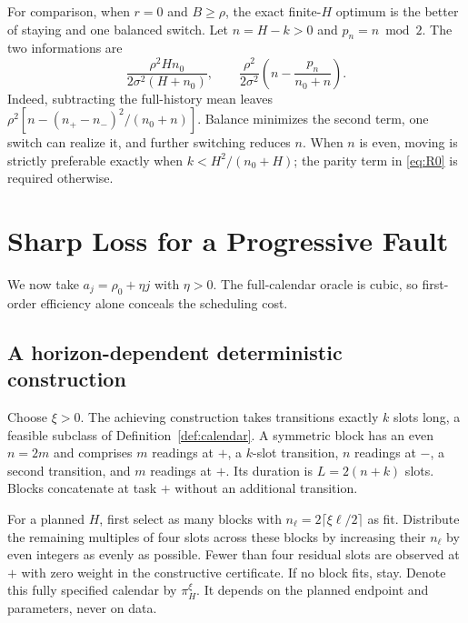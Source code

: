 For comparison, when $r=0$ and $B\ge\rho$, the exact finite-$H$ optimum is the better of staying and one balanced switch. Let $n=H-k>0$ and $p_n=n\bmod2$. The two informations are
\begin{equation}
 \frac{\rho^2Hn_0}{2\sigma^2(H+n_0)},\qquad
 \frac{\rho^2}{2\sigma^2}\left(n-\frac{p_n}{n_0+n}\right).\label{eq:R0}
\end{equation}
Indeed, subtracting the full-history mean leaves $\rho^2[n-(n_+-n_-)^2/(n_0+n)]$. Balance minimizes the second term, one switch can realize it, and further switching reduces $n$. When $n$ is even, moving is strictly preferable exactly when $k<H^2/(n_0+H)$; the parity term in \eqref{eq:R0} is required otherwise.

\section{Sharp Loss for a Progressive Fault}
We now take $a_j=\rho_0+\eta j$ with $\eta>0$. The full-calendar oracle is cubic, so first-order efficiency alone conceals the scheduling cost.

\subsection{A horizon-dependent deterministic construction}
Choose $\xi>0$. The achieving construction takes transitions exactly $k$ slots long, a feasible subclass of Definition~\ref{def:calendar}. A symmetric block has an even $n=2m$ and comprises $m$ readings at $+$, a $k$-slot transition, $n$ readings at $-$, a second transition, and $m$ readings at $+$. Its duration is $L=2(n+k)$ slots. Blocks concatenate at task $+$ without an additional transition.

For a planned $H$, first select as many blocks with $n_\ell=2\lceil\xi\ell/2\rceil$ as fit. Distribute the remaining multiples of four slots across these blocks by increasing their $n_\ell$ by even integers as evenly as possible. Fewer than four residual slots are observed at $+$ with zero weight in the constructive certificate. If no block fits, stay. Denote this fully specified calendar by $\pi_H^\xi$. It depends on the planned endpoint and parameters, never on data.

